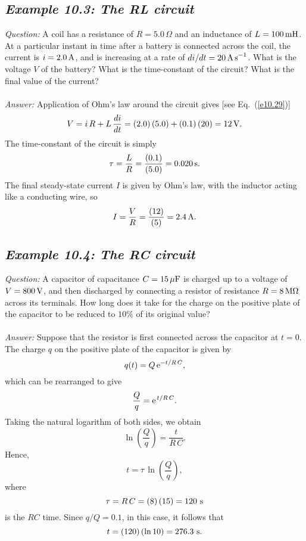 \subsection*{\em Example 10.3: The RL circuit}
{\em Question:} A coil has a resistance of $R=5.0\,\Omega$ and
an inductance of $L= 100\,{\rm mH}$. At a particular instant in time
after a battery is connected across the coil, the current is $i=2.0\,{\rm A}$,
and is increasing at a rate of $d i/dt=20\,{\rm A\,s}^{-1}$. What is the voltage
$V$ of the battery? What is the time-constant of the circuit? What is
the final value of the current?\\
~\\
{\em Answer:} Application of Ohm's law around the circuit gives [see Eq.~(\ref{e10.29})]
$$
V = i\,R + L\,\frac{di}{d t}
= (2.0)\,(5.0) + (0.1)\,(20) = 12\,{\rm V}.
$$
The time-constant of the circuit is simply
$$
\tau = \frac{L}{R} = \frac{(0.1)}{(5.0)} = 0.020\,{\rm s}.
$$
The final steady-state current $I$ is given by Ohm's law, with the inductor acting
like a conducting wire, so
$$
I= \frac{V}{R} = \frac{(12)}{(5)} = 2.4\, {\rm A}.
$$


\subsection*{\em Example 10.4: The RC circuit}
{\em Question:} A capacitor of capacitance $C= 15\,\mu{\rm F}$ is charged up to a
voltage of $V = 800\,{\rm V}$, and then discharged by connecting a
resistor of resistance $R=8\,{\rm M}\Omega$ across its terminals. How
long does it take for the charge on the positive plate of the capacitor to
be reduced to $10\%$ of its original value?\\
~\\
{\em Answer:} Suppose that the resistor is first connected across the 
capacitor at $t=0$. The charge $q$ on the positive plate of the capacitor
is given by
$$
q(t) = Q\,{\rm e}^{-t/R\,C},
$$
which can be rearranged to give
$$
\frac{Q}{q} = {\rm e}^{\,t/R\,C}.
$$
Taking the natural logarithm of both sides, we obtain
$$
\ln\left(\frac{Q}{q}\right) = \frac{t}{R\,C}.
$$
Hence,
$$
t = \tau\,\ln\left(\frac{Q}{q}\right),
$$
where
$$
\tau = R\,C = (8)\,(15) = 120\,\,{\rm s}
$$
is the $RC$ time. Since $q/Q = 0.1$, in this case, it follows that
$$
t = (120) \,(\ln 10)= 276.3\,\,{\rm s}.
$$


